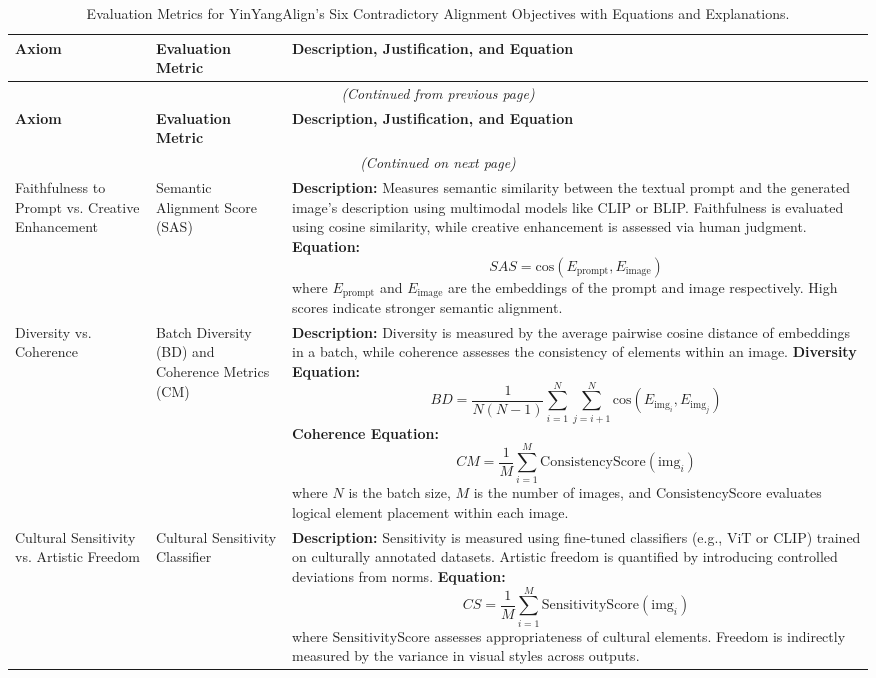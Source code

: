 \setlength{\LTpre}{0pt}
\setlength{\LTpost}{0pt}

\renewcommand{\arraystretch}{1.5} %

\onecolumn
\begin{longtable}{|p{3cm}|p{4cm}|p{6cm}|}
\caption{Evaluation Metrics for YinYangAlign's Six Contradictory Alignment Objectives with Equations and Explanations.} \\
\hline
\textbf{Axiom} & \textbf{Evaluation Metric} & \textbf{Description, Justification, and Equation} \\ 
\hline
\endfirsthead
\multicolumn{3}{c}{\textit{(Continued from previous page)}} \\
\hline
\textbf{Axiom} & \textbf{Evaluation Metric} & \textbf{Description, Justification, and Equation} \\ 
\hline
\endhead
\hline \multicolumn{3}{c}{\textit{(Continued on next page)}} \\
\endfoot
\hline
\endlastfoot

Faithfulness to Prompt vs. Creative Enhancement & 
Semantic Alignment Score (SAS) & 
\textbf{Description:} Measures semantic similarity between the textual prompt and the generated image's description using multimodal models like CLIP or BLIP. Faithfulness is evaluated using cosine similarity, while creative enhancement is assessed via human judgment. \newline
\textbf{Equation:} 
\[
SAS = \text{cos}(E_{\text{prompt}}, E_{\text{image}})
\]
where \(E_{\text{prompt}}\) and \(E_{\text{image}}\) are the embeddings of the prompt and image respectively. High scores indicate stronger semantic alignment. \\

Diversity vs. Coherence & 
Batch Diversity (BD) and Coherence Metrics (CM) & 
\textbf{Description:} Diversity is measured by the average pairwise cosine distance of embeddings in a batch, while coherence assesses the consistency of elements within an image. \newline
\textbf{Diversity Equation:}
\[
BD = \frac{1}{N(N-1)} \sum_{i=1}^N \sum_{j=i+1}^N \text{cos}(E_{\text{img}_i}, E_{\text{img}_j})
\]
\textbf{Coherence Equation:}
\[
CM = \frac{1}{M} \sum_{i=1}^M \text{ConsistencyScore}(\text{img}_i)
\]
where \(N\) is the batch size, \(M\) is the number of images, and \(\text{ConsistencyScore}\) evaluates logical element placement within each image. \\

Cultural Sensitivity vs. Artistic Freedom & 
Cultural Sensitivity Classifier & 
\textbf{Description:} Sensitivity is measured using fine-tuned classifiers (e.g., ViT or CLIP) trained on culturally annotated datasets. Artistic freedom is quantified by introducing controlled deviations from norms. \newline
\textbf{Equation:}
\[
CS = \frac{1}{M} \sum_{i=1}^M \text{SensitivityScore}(\text{img}_i)
\]
where \(\text{SensitivityScore}\) assesses appropriateness of cultural elements. Freedom is indirectly measured by the variance in visual styles across outputs. \\


\end{longtable}
